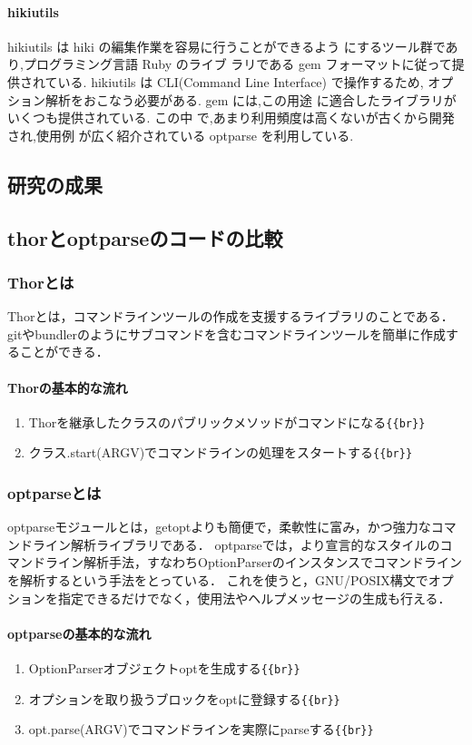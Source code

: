 \documentclass[10pt,a4j]{article}
\begin{document}
\paragraph{hikiutils}
hikiutils は hiki の編集作業を容易に行うことができるよう にするツール群であり,プログラミング言語 Ruby のライブ ラリである gem フォーマットに従って提供されている. 
hikiutils は CLI(Command Line Interface) で操作するため, オプション解析をおこなう必要がある. 
gem には,この用途 に適合したライブラリがいくつも提供されている. 
この中 で,あまり利用頻度は高くないが古くから開発され,使用例 が広く紹介されている optparse を利用している.

\subsection{研究の成果}
\subsection{thorとoptparseのコードの比較}
\subsubsection{Thorとは}
Thorとは，コマンドラインツールの作成を支援するライブラリのことである． gitやbundlerのようにサブコマンドを含むコマンドラインツールを簡単に作成することができる．

\paragraph{Thorの基本的な流れ}
\begin{enumerate}
\item Thorを継承したクラスのパブリックメソッドがコマンドになる\verb|{{br}}|
\item クラス.start(ARGV)でコマンドラインの処理をスタートする\verb|{{br}}|
\end{enumerate}
\subsubsection{optparseとは}
optparseモジュールとは，getoptよりも簡便で，柔軟性に富み，かつ強力なコマンドライン解析ライブラリである．
optparseでは，より宣言的なスタイルのコマンドライン解析手法，すなわちOptionParserのインスタンスでコマンドラインを解析するという手法をとっている．
これを使うと，GNU/POSIX構文でオプションを指定できるだけでなく，使用法やヘルプメッセージの生成も行える．

\paragraph{optparseの基本的な流れ}
\begin{enumerate}
\item OptionParserオブジェクトoptを生成する\verb|{{br}}|
\item オプションを取り扱うブロックをoptに登録する\verb|{{br}}|
\item opt.parse(ARGV)でコマンドラインを実際にparseする\verb|{{br}}|
\end{enumerate}
\end{document}

